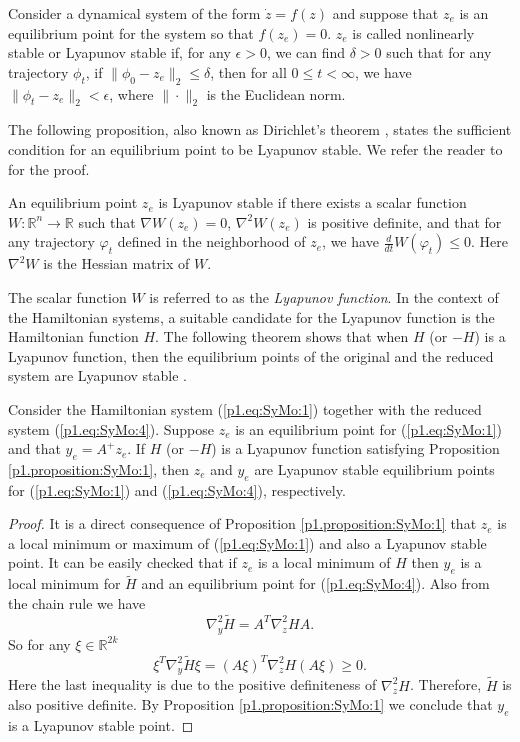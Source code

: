 \begin{definition} \label{p1.definition:SyMo:1} \cite{bhatia2002stability}
Consider a dynamical system of the form $\dot{z} = f(z)$ and suppose that $z_e$ is an equilibrium point for the system so that $f(z_e) = 0$. $ z_e$ is called nonlinearly stable or Lyapunov stable if, for any $\epsilon > 0$, we can find $\delta > 0$ such that for any trajectory $\phi_t$, if $\| \phi_0 -  z_e \|_2 \leq \delta$, then for all $0 \leq t < \infty$, we have $\| \phi_t -  z_e \|_2 < \epsilon$, where $\| \cdot \|_2$ is the Euclidean norm.
\end{definition}	
The following proposition, also known as Dirichlet's theorem \cite{bhatia2002stability}, states the sufficient condition for an equilibrium point to be Lyapunov stable. We refer the reader to \cite{bhatia2002stability} for the proof.
\begin{proposition} \label{p1.proposition:SyMo:1} \cite{bhatia2002stability}
An equilibrium point $ z_e$ is Lyapunov stable if there exists a scalar function $W : \mathbb R^{n} \to  \mathbb R$ such that $\nabla W( z_e) = 0$, $\nabla^2 W(z_e)$ is positive definite, and that for any trajectory $\varphi_t$ defined in the neighborhood of $ z_e$, we have $\frac{d}{dt} W(\varphi_t) \leq 0$. Here $\nabla^2W$ is the Hessian matrix of $W$.
\end{proposition}
The scalar function $W$ is referred to as the \emph{Lyapunov function}. In the context of the Hamiltonian systems, a suitable candidate for the Lyapunov function is the Hamiltonian function $H$. The following theorem shows that when $H$ (or $-H$) is a Lyapunov function, then the equilibrium points of the original and the reduced system are Lyapunov stable \cite{abraham1978foundations}. 
\begin{theorem} \label{p1.theorem:SyMo:1}
Consider the Hamiltonian system (\ref{p1.eq:SyMo:1}) together with the reduced system (\ref{p1.eq:SyMo:4}). Suppose $z_e$ is an equilibrium point for (\ref{p1.eq:SyMo:1}) and that $y_e = A^+z_e$. If $H$ (or $-H$) is a Lyapunov function satisfying Proposition \ref{p1.proposition:SyMo:1}, then $z_e$ and $ y_e$ are Lyapunov stable equilibrium points for (\ref{p1.eq:SyMo:1}) and (\ref{p1.eq:SyMo:4}), respectively. 
\end{theorem}
\begin{proof}
	It is a direct consequence of Proposition \ref{p1.proposition:SyMo:1} that $ z_e$ is a local minimum or maximum of (\ref{p1.eq:SyMo:1}) and also a Lyapunov stable point. It can be easily checked that if $ z_e$ is a local minimum of $H$ then $y_e$ is a local minimum for $\tilde H$ and an equilibrium point for (\ref{p1.eq:SyMo:4}). Also from the chain rule we have
\[
	\nabla^2_{y} \tilde H = A^T \nabla^2_{z} H A.
\]
So for any $\xi \in \mathbb R^{2k}$
\[
	\xi^T \nabla^2_{y} \tilde H \xi = (A\xi)^T \nabla^2_{z} H (A\xi) \geq 0.
\]
Here the last inequality is due to the positive definiteness of $\nabla^2_z H$. Therefore, $\tilde H$ is also positive definite. By Proposition \ref{p1.proposition:SyMo:1} we conclude that $ y_e$ is a Lyapunov stable point.
\end{proof}

